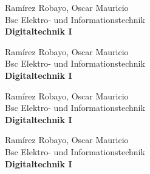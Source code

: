 \documentclass{book}
\begin{document}
\thispagestyle{empty}
\begin{flushright}Ramírez Robayo, Oscar Mauricio\\Bsc Elektro- und Informationstechnik\\\textbf{Digitaltechnik I}\end{flushright}\noindent\makebox[\linewidth]{\rule{\paperwidth}{0.4pt}}
\clearpage
\thispagestyle{empty}
\begin{flushright}Ramírez Robayo, Oscar Mauricio\\Bsc Elektro- und Informationstechnik\\\textbf{Digitaltechnik I}\end{flushright}\noindent\makebox[\linewidth]{\rule{\paperwidth}{0.4pt}}
\clearpage
\thispagestyle{empty}
\begin{flushright}Ramírez Robayo, Oscar Mauricio\\Bsc Elektro- und Informationstechnik\\\textbf{Digitaltechnik I}\end{flushright}\noindent\makebox[\linewidth]{\rule{\paperwidth}{0.4pt}}\clearpage
\thispagestyle{empty}
\begin{flushright}Ramírez Robayo, Oscar Mauricio\\Bsc Elektro- und Informationstechnik\\\textbf{Digitaltechnik I}\end{flushright}\noindent\makebox[\linewidth]{\rule{\paperwidth}{0.4pt}}
\end{document}
